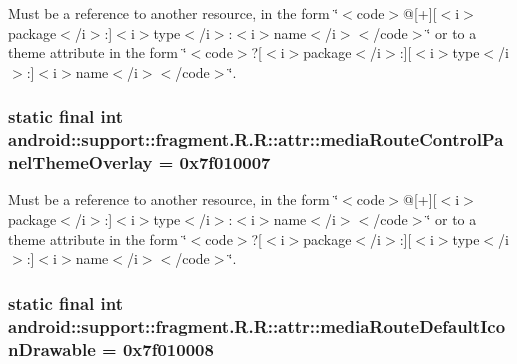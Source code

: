 Must be a reference to another resource, in the form \char`\"{}$<$code$>$@\mbox{[}+\mbox{]}\mbox{[}$<$i$>$package$<$/i$>$:\mbox{]}$<$i$>$type$<$/i$>$:$<$i$>$name$<$/i$>$$<$/code$>$\char`\"{} or to a theme attribute in the form \char`\"{}$<$code$>$?\mbox{[}$<$i$>$package$<$/i$>$:\mbox{]}\mbox{[}$<$i$>$type$<$/i$>$:\mbox{]}$<$i$>$name$<$/i$>$$<$/code$>$\char`\"{}. \hypertarget{classandroid_1_1support_1_1fragment_1_1_r_1_1attr_b388c9a06885841bffdbda3c69ba8346}{
\subsubsection[{mediaRouteControlPanelThemeOverlay}]{\setlength{\rightskip}{0pt plus 5cm}static final int android::support::fragment.R.R::attr::mediaRouteControlPanelThemeOverlay = 0x7f010007}}
\label{classandroid_1_1support_1_1fragment_1_1_r_1_1attr_b388c9a06885841bffdbda3c69ba8346}


Must be a reference to another resource, in the form \char`\"{}$<$code$>$@\mbox{[}+\mbox{]}\mbox{[}$<$i$>$package$<$/i$>$:\mbox{]}$<$i$>$type$<$/i$>$:$<$i$>$name$<$/i$>$$<$/code$>$\char`\"{} or to a theme attribute in the form \char`\"{}$<$code$>$?\mbox{[}$<$i$>$package$<$/i$>$:\mbox{]}\mbox{[}$<$i$>$type$<$/i$>$:\mbox{]}$<$i$>$name$<$/i$>$$<$/code$>$\char`\"{}. \hypertarget{classandroid_1_1support_1_1fragment_1_1_r_1_1attr_aeacbfcee7840afb8a9661af69428c5c}{
\subsubsection[{mediaRouteDefaultIconDrawable}]{\setlength{\rightskip}{0pt plus 5cm}static final int android::support::fragment.R.R::attr::mediaRouteDefaultIconDrawable = 0x7f010008}}
\label{classandroid_1_1support_1_1fragment_1_1_r_1_1attr_aeacbfcee7840afb8a9661af69428c5c}


